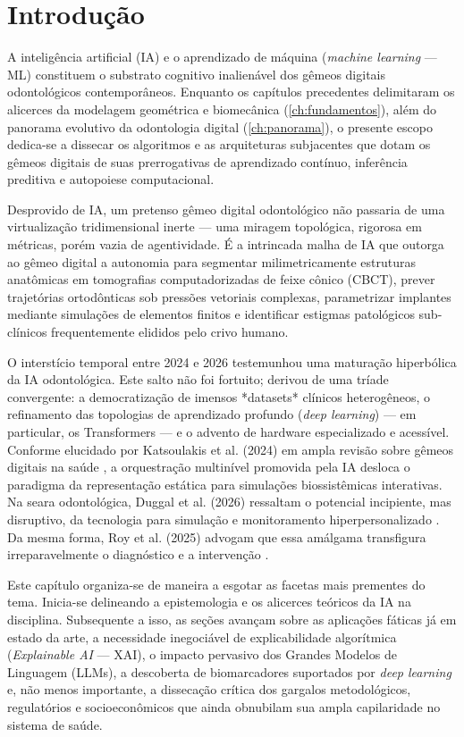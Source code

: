 \section{Introdução}

A inteligência artificial (IA) e o aprendizado de máquina (\textit{machine learning} --- ML) constituem o substrato cognitivo inalienável dos gêmeos digitais odontológicos contemporâneos. Enquanto os capítulos precedentes delimitaram os alicerces da modelagem geométrica e biomecânica (\autoref{ch:fundamentos}), além do panorama evolutivo da odontologia digital (\autoref{ch:panorama}), o presente escopo dedica-se a dissecar os algoritmos e as arquiteturas subjacentes que dotam os gêmeos digitais de suas prerrogativas de aprendizado contínuo, inferência preditiva e autopoiese computacional.

Desprovido de IA, um pretenso gêmeo digital odontológico não passaria de uma virtualização tridimensional inerte --- uma miragem topológica, rigorosa em métricas, porém vazia de agentividade. É a intrincada malha de IA que outorga ao gêmeo digital a autonomia para segmentar milimetricamente estruturas anatômicas em tomografias computadorizadas de feixe cônico (CBCT), prever trajetórias ortodônticas sob pressões vetoriais complexas, parametrizar implantes mediante simulações de elementos finitos e identificar estigmas patológicos sub-clínicos frequentemente elididos pelo crivo humano.

O interstício temporal entre 2024 e 2026 testemunhou uma maturação hiperbólica da IA odontológica. Este salto não foi fortuito; derivou de uma tríade convergente: a democratização de imensos *datasets* clínicos heterogêneos, o refinamento das topologias de aprendizado profundo (\textit{deep learning}) --- em particular, os Transformers --- e o advento de hardware especializado e acessível. Conforme elucidado por Katsoulakis et al. (2024) em ampla revisão sobre gêmeos digitais na saúde \cite{katsoulakis2024digital}, a orquestração multinível promovida pela IA desloca o paradigma da representação estática para simulações biossistêmicas interativas. Na seara odontológica, Duggal et al. (2026) ressaltam o potencial incipiente, mas disruptivo, da tecnologia para simulação e monitoramento hiperpersonalizado \cite{duggal2026exploring}. Da mesma forma, Roy et al. (2025) advogam que essa amálgama transfigura irreparavelmente o diagnóstico e a intervenção \cite{roy2025editorial}.


Este capítulo organiza-se de maneira a esgotar as facetas mais prementes do tema. Inicia-se delineando a epistemologia e os alicerces teóricos da IA na disciplina. Subsequente a isso, as seções avançam sobre as aplicações fáticas já em estado da arte, a necessidade inegociável de explicabilidade algorítmica (\textit{Explainable AI} --- XAI), o impacto pervasivo dos Grandes Modelos de Linguagem (LLMs), a descoberta de biomarcadores suportados por \textit{deep learning} e, não menos importante, a dissecação crítica dos gargalos metodológicos, regulatórios e socioeconômicos que ainda obnubilam sua ampla capilaridade no sistema de saúde.
